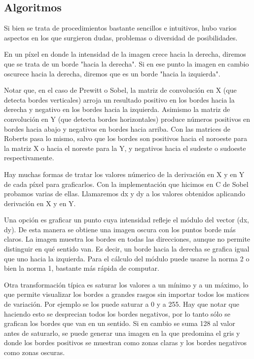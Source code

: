\subsection{Algoritmos}
Si bien se trata de procedimientos bastante sencillos e intuitivos, hubo varios aspectos en los que surgieron dudas, problemas o diversidad de posibilidades.

En un píxel en donde la intensidad de la imagen crece hacia la derecha, diremos que se trata de un borde "hacia la derecha". Si en ese punto la imagen en cambio oscurece hacia la derecha, diremos que es un borde "hacia la izquierda".

Notar que, en el caso de Prewitt o Sobel, la matriz de convolución en X (que detecta bordes verticales) arroja un resultado positivo en los bordes hacia la derecha y negativo en los bordes hacia la izquierda. Asimismo la matriz de convolución en Y (que detecta bordes horizontales) produce números positivos en bordes hacia abajo y negativos en bordes hacia arriba. Con las matrices de Roberts pasa lo mismo, salvo que los bordes son positivos hacia el noroeste para la matriz X o hacia el noreste para la Y, y negativos hacia el sudeste o sudoeste respectivamente.

Hay muchas formas de tratar los valores númerico de la derivación en X y en Y de cada píxel para graficarlos. Con la implementación que hicimos en C de Sobel probamos varias de ellas. Llamaremos dx y dy a los valores obtenidos aplicando derivación en X y en Y.

Una opción es graficar un punto cuya intensidad refleje el módulo del vector (dx, dy). De esta manera se obtiene una imagen oscura con los puntos borde más claros. La imagen muestra los bordes en todas las direcciones, aunque no permite distinguir en qué sentido van. Es decir, un borde hacia la derecha se grafica igual que uno hacia la izquierda. Para el cálculo del módulo puede usarse la norma 2 o bien la norma 1, bastante más rápida de computar.

Otra transformación típica es saturar los valores a un mínimo y a un máximo, lo que permite visualizar los bordes a grandes rasgos sin importar todos los matices de variación. Por ejemplo se los puede saturar a 0 y a 255. Hay que notar que haciendo esto se desprecian todos los bordes negativos, por lo tanto sólo se grafican los bordes que van en un sentido. Si en cambio se suma 128 al valor antes de saturarlo, se puede generar una imagen en la que predomina el gris y donde los bordes positivos se muestran como zonas claras y los bordes negativos como zonas oscuras.

